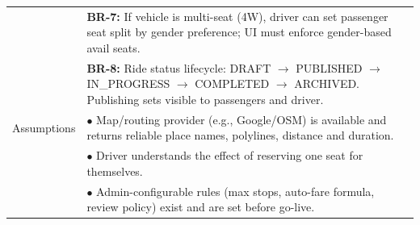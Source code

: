 \begin{longtable}{|>{\raggedright\arraybackslash}p{4cm}|>{\raggedright\arraybackslash}p{11cm}|}
& \textbf{BR-7:} If vehicle is multi-seat (4W), driver can set passenger seat split by gender preference; UI must enforce gender-based avail seats. \\
& \textbf{BR-8:} Ride status lifecycle: DRAFT $\rightarrow$ PUBLISHED $\rightarrow$ IN\_PROGRESS $\rightarrow$ COMPLETED $\rightarrow$ ARCHIVED. Publishing sets visible to passengers and driver. \\
\hline
Assumptions & $\bullet$ Map/routing provider (e.g., Google/OSM) is available and returns reliable place names, polylines, distance and duration. \\
& $\bullet$ Driver understands the effect of reserving one seat for themselves. \\
& $\bullet$ Admin-configurable rules (max stops, auto-fare formula, review policy) exist and are set before go-live. \\
\end{longtable}

